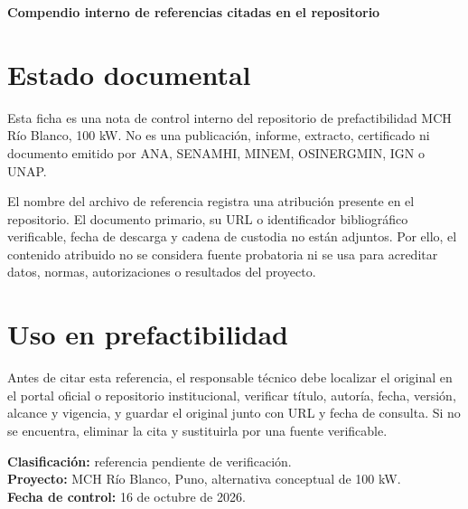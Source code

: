 \documentclass[11pt,a4paper]{article}
\begin{document}
\begin{center}\Large\bfseries\color{navy}Compendio interno de referencias citadas en el repositorio\end{center}
\vspace{1em}
\section*{Estado documental}
Esta ficha es una nota de control interno del repositorio de prefactibilidad MCH Río Blanco, 100 kW. No es una publicación, informe, extracto, certificado ni documento emitido por ANA, SENAMHI, MINEM, OSINERGMIN, IGN o UNAP.

El nombre del archivo de referencia registra una atribución presente en el repositorio. El documento primario, su URL o identificador bibliográfico verificable, fecha de descarga y cadena de custodia no están adjuntos. Por ello, el contenido atribuido no se considera fuente probatoria ni se usa para acreditar datos, normas, autorizaciones o resultados del proyecto.

\section*{Uso en prefactibilidad}
Antes de citar esta referencia, el responsable técnico debe localizar el original en el portal oficial o repositorio institucional, verificar título, autoría, fecha, versión, alcance y vigencia, y guardar el original junto con URL y fecha de consulta. Si no se encuentra, eliminar la cita y sustituirla por una fuente verificable.

\vfill
\noindent\textbf{Clasificación:} referencia pendiente de verificación.\\
\textbf{Proyecto:} MCH Río Blanco, Puno, alternativa conceptual de 100 kW.\\
\textbf{Fecha de control:} 16 de octubre de 2026.
\end{document}
